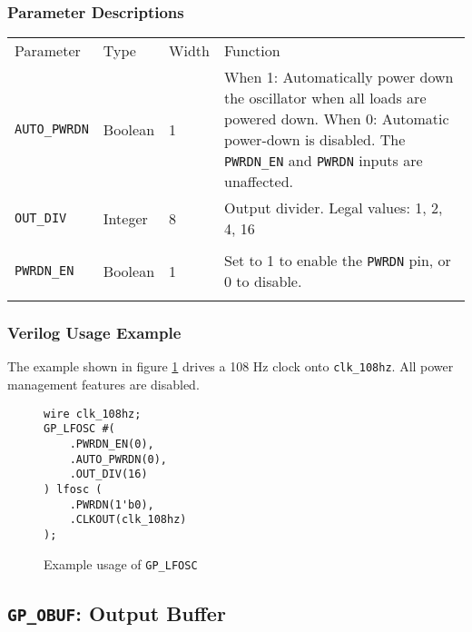 \documentclass[11pt]{article}
\newcommand{\tokenstyle}[1]{\texttt{#1}}
\newcommand{\wirestyle}[1]{\texttt{#1}}
\newcommand{\whenstyle}[1]{{\fontseries{sb}\selectfont#1}}
\newcommand{\thinhline}{\Xhline{1\arrayrulewidth}}
\newcommand{\thickhline}{\Xhline{2.5\arrayrulewidth}}
\begin{document}
\subsubsection{Parameter Descriptions}

\begin{tabularx}{\textwidth}{lllX}
\thinhline
\whenstyle{Parameter} & \whenstyle{Type} & \whenstyle{Width} & \whenstyle{Function} \\
\thickhline
\tokenstyle{AUTO\_PWRDN} & Boolean & 1 &
	\whenstyle{When 1:} Automatically power down the oscillator when all loads are powered down. \newline
	\whenstyle{When 0:} Automatic power-down is disabled. The \tokenstyle{PWRDN\_EN} and \tokenstyle{PWRDN} inputs are unaffected.\\
\thinhline
\tokenstyle{OUT\_DIV} & Integer & 8 &
	Output divider. Legal values: 1, 2, 4, 16 \\
\\
\thinhline
\tokenstyle{PWRDN\_EN} & Boolean & 1 & Set to 1 to enable the \tokenstyle{PWRDN} pin, or 0 to disable. \\
\thinhline
\end{tabularx}

\subsubsection{Verilog Usage Example}

The example shown in figure \ref{gp-lfosc-example} drives a 108 Hz clock onto \wirestyle{clk\_108hz}. All power management features
are disabled.

\begin{figure}[h]
\begin{lstlisting}
wire clk_108hz;
GP_LFOSC #(
	.PWRDN_EN(0),
	.AUTO_PWRDN(0),
	.OUT_DIV(16)
) lfosc (
	.PWRDN(1'b0),
	.CLKOUT(clk_108hz)
);
\end{lstlisting}
\caption{Example usage of \tokenstyle{GP\_LFOSC}}
\label{gp-lfosc-example}
\end{figure}


\pagebreak
\subsection{\tokenstyle{GP\_OBUF}: Output Buffer}
\label{gp-obuf}
\end{document}
